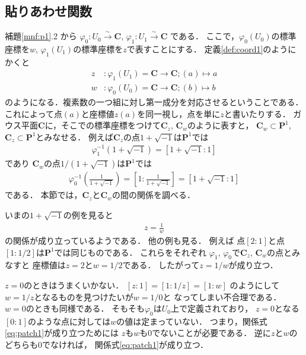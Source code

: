 \documentclass[11pt, a4paper, dvipdfmx]{jsarticle}
\theoremstyle{definition}
\newcommand{\cc}{\mathbf{C}}
\newcommand{\pp}{\mathbf{P}}
\newcommand{\pphi}{\varphi} %
\newcommand{\isom}{\overset{\sim}{\longrightarrow}}
\theoremstyle{mystyle}
\numberwithin{equation}{section} %
\begin{document}
\subsection{貼りあわせ関数}\label{ssec:patch}

補題\ref{mnf:p1}.2 から
$\pphi_0 \colon U_0\isom\cc$, $\pphi_1\colon {U_1} \isom\cc$
である．
ここで，$\pphi_0(U_0)$の標準座標を$w$, 
$\pphi_1(U_1)$の標準座標を$z$で表すことにする．
定義\ref{def:coord1}のようにかくと
\begin{align*}
    z&\colon \pphi_1(U_1)= \cc \to \cc; (a)\mapsto a\\
    w&\colon \pphi_0(U_0)= \cc \to \cc; (b)\mapsto b
\end{align*}
のようになる．複素数の一つ組に対し第一成分を対応させるということである．
これによって点$(a)$と座標値$z(a)$を同一視し，点を単に$z$と書いたりする．
ガウス平面$\cc$に，そこでの標準座標をつけて$\cc_z$, $\cc_w$のように表すと，
$\cc_w\subset\pp^1$, $\cc_z\subset\pp^1$とみなせる．
例えば$\cc_z$の点$1+\sqrt{-1}$は$\pp^1$では
\begin{align*}
    \pphi_1^{-1}\left(1+\sqrt{-1}\right)=\left[1+\sqrt{-1}\colon 1\right]    
\end{align*}
であり
$\cc_w$の点$1/(1+\sqrt{-1})$は$\pp^1$では
\begin{align*}
    \pphi_0^{-1}\left(\frac{1}{1+\sqrt{-1}}\right)
    =\left[1\colon \frac{1}{1+\sqrt{-1}}\right]
    =\left[1+\sqrt{-1}\colon 1\right]        
\end{align*}
である．
本節では，$\cc_z$と$\cc_w$の間の関係を調べる．

いまの$1+\sqrt{-1}$の例を見ると
\begin{align}\label{eq:patch1}
    z=\frac{1}{w}
\end{align}
の関係が成り立っているようである．
他の例も見る．
例えば
点$[2\colon 1]$と点$[1\colon 1/2]$は$\pp^1$では同じものである．
これらをそれぞれ
$\pphi_1$, $\pphi_0$で$\cc_z$, $\cc_w$の点とみなすと
座標値は$z=2$と$w=1/2$である．
したがって$z=1/w$が成り立つ．

$z=0$のときはうまくいかない．
$[z\colon 1] = [1\colon 1/z] = [1\colon w]$
のようにして$w=1/z$となるものを見つけたいが$w=1/0$と
なってしまい不合理である．
$w=0$のときも同様である．
そもそも$\pphi_0$は$U_0$上で定義されており，
$z=0$となる$[0\colon 1]$のような点に対しては$w$の値は定まっていない．
つまり，関係式\eqref{eq:patch1}が成り立つためには
$z$も$w$も0でないことが必要である．
逆に$z$と$w$のどちらも0でなければ，
関係式\eqref{eq:patch1}が成り立つ．
\end{document}
